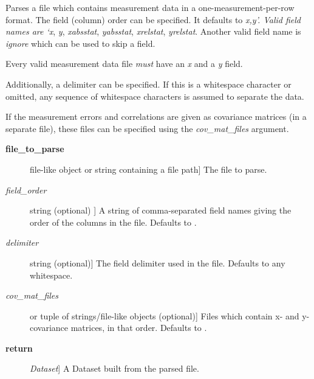 \documentclass[a4paper,10pt,english]{sphinxmanual}
\begin{document}
\begin{fulllineitems}
\label{index:kafe.file_tools.parse_column_data}
Parses a file which contains measurement data in a one-measurement-per-row format.
The field (column) order can be specified. It defaults to \emph{x,y'. Valid field names are
{}`x}, \emph{y}, \emph{xabsstat}, \emph{yabsstat}, \emph{xrelstat}, \emph{yrelstat}. Another
valid field name is \emph{ignore} which can be used to skip a field.

Every valid measurement data file \emph{must} have an \emph{x} and a \emph{y} field.

Additionally, a delimiter can be specified. If this is a whitespace character or omitted, any
sequence of whitespace characters is assumed to separate the data.

If the measurement errors and correlations are given as covariance matrices (in a separate file),
these files can be specified using the \emph{cov\_mat\_files} argument.
\begin{description}
\item[{\textbf{file\_to\_parse}}] \leavevmode{[}file-like object or string containing a file path{]}
The file to parse.

\item[{\emph{field\_order}}] \leavevmode{[}string (optional) {]}
A string of comma-separated field names giving the order of the columns in the file. Defaults to .

\item[{\emph{delimiter}}] \leavevmode{[}string (optional){]}
The field delimiter used in the file. Defaults to any whitespace.

\item[{\emph{cov\_mat\_files}}] \leavevmode{[} or tuple of strings/file-like objects (optional){]}
Files which contain x- and y-covariance matrices, in that order. Defaults to .

\item[{\textbf{return}}] \leavevmode{[}\emph{Dataset}{]}
A Dataset built from the parsed file.

\end{description}

\end{fulllineitems}
\end{document}
